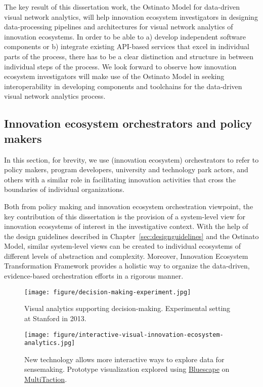 The key result of this dissertation work, the Ostinato Model for data-driven visual network analytics, will help innovation ecosystem investigators in designing data-processing pipelines and architectures for visual network analytics of innovation ecosystems. In order to be able to a) develop independent software components or b) integrate existing API-based services that excel in individual parts of the process, there has to be a clear distinction and structure in between individual steps of the process. We look forward to observe how innovation ecosystem investigators will make use of the Ostinato Model in seeking interoperability in developing components and toolchains for the data-driven visual network analytics process.

\subsection{Innovation ecosystem orchestrators and policy makers}

In this section, for brevity, we use (innovation ecosystem) orchestrators to refer to policy makers, program developers, university and technology park actors, and others with a similar role in facilitating innovation activities that cross the boundaries of individual organizations.

Both from policy making and innovation ecosystem orchestration viewpoint, the key contribution of this dissertation is the provision of a system-level view for innovation ecosystems of interest in the investigative context. With the help of the design guidelines described in Chapter~\ref{sec:designguidelines} and the Ostinato Model, similar system-level views can be created to individual ecosystems of different levels of abstraction and complexity. Moreover, Innovation Ecosystem Transformation Framework \citep{Russell2011TransformingOrchestration, Russell2015RelationalEcosystems} provides a holistic way to organize the data-driven, evidence-based orchestration efforts in a rigorous manner.

\begin{figure}[htb]
\centering
\texttt{[image: figure/decision-making-experiment.jpg]}
\caption{Visual analytics supporting decision-making. Experimental setting at Stanford in 2013.}
\label{fig:experiment}
\end{figure}

\begin{figure}[htb]
\centering
\texttt{[image: figure/interactive-visual-innovation-ecosystem-analytics.jpg]}
\caption{New technology allows more interactive ways to explore data for sensemaking. Prototype visualization explored using \href{https://www.bluescape.com/}{Bluescape} on \href{http://www.multitaction.com/}{MultiTaction}.}
\label{fig:interactiveanalytics}
\end{figure}

